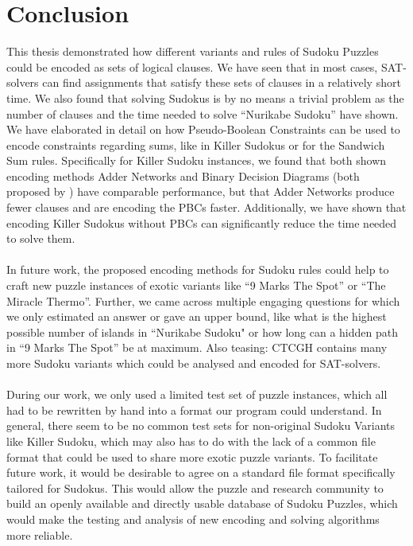 \chapter{Conclusion}
This thesis demonstrated how different variants and rules of Sudoku Puzzles could be encoded as sets of logical clauses. We have seen that in most cases, SAT-solvers can find assignments that satisfy these sets of clauses in a relatively short time. We also found that solving Sudokus is by no means a trivial problem as the number of clauses and the time needed to solve ``Nurikabe Sudoku'' have shown. We have elaborated in detail on how Pseudo-Boolean Constraints can be used to encode constraints regarding sums, like in Killer Sudokus or for the Sandwich Sum rules. Specifically for Killer Sudoku instances, we found that both shown encoding methods Adder Networks and Binary Decision Diagrams (both proposed by \cite{Een2006TranslatingPC}) have comparable performance, but that Adder Networks produce fewer clauses and are encoding the PBCs faster. Additionally, we have shown that encoding Killer Sudokus without PBCs can significantly reduce the time needed to solve them.\\
\\
In future work, the proposed encoding methods for Sudoku rules could help to craft new puzzle instances of exotic variants like ``9 Marks The Spot'' or ``The Miracle Thermo''. Further, we came across multiple engaging questions for which we only estimated an answer or gave an upper bound, like what is the highest possible number of islands in ``Nurikabe Sudoku" or how long can a hidden path in ``9 Marks The Spot'' be at maximum. Also teasing: CTCGH \cite{CrackingTheCryptic2021} contains many more Sudoku variants which could be analysed and encoded for SAT-solvers.\\
\\
During our work, we only used a limited test set of puzzle instances, which all had to be rewritten by hand into a format our program could understand. In general, there seem to be no common test sets for non-original Sudoku Variants like Killer Sudoku, which may also has to do with the lack of a common file format that could be used to share more exotic puzzle variants. To facilitate future work, it would be desirable to agree on a standard file format specifically tailored for Sudokus. This would allow the puzzle and research community to build an openly available and directly usable database of Sudoku Puzzles, which would make the testing and analysis of new encoding and solving algorithms more reliable.
